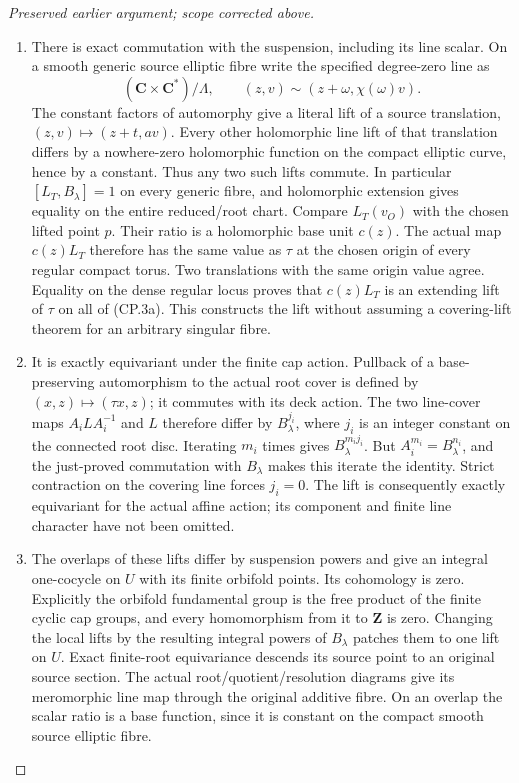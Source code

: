 \begin{proof}[Preserved earlier argument; scope corrected above]
\begin{enumerate}[label=\arabic*.]
\item There is exact commutation with the suspension, including its line
scalar. On a smooth generic source elliptic fibre write the
specified degree-zero line as
\[
 (\mathbf C\times\mathbf C^*)/\Lambda,\qquad
 (z,v)\sim(z+\omega,\chi(\omega)v).
\]
The constant factors of automorphy give a literal lift of a source
translation, \((z,v)\mapsto(z+t,av)\). Every other holomorphic
line lift of that translation differs by a nowhere-zero holomorphic
function on the compact elliptic curve, hence by a constant. Thus
any two such lifts commute. In particular \([L_T,B_\lambda]=1\)
on every generic fibre, and holomorphic extension gives equality
on the entire reduced/root chart. Compare \(L_T(v_O)\) with the
chosen lifted point \(p\). Their ratio is a holomorphic base unit
\(c(z)\). The actual map \(c(z)L_T\) therefore has the same value
as \(\tau\) at the chosen origin of every regular compact torus.
Two translations with the same origin value agree. Equality on the
dense regular locus proves that \(c(z)L_T\) is an extending lift of
\(\tau\) on all of (CP.3a). This constructs the lift without
assuming a covering-lift theorem for an arbitrary singular fibre.

\item It is exactly equivariant under the finite cap action. Pullback of
a base-preserving automorphism to the actual root cover is defined
by \((x,z)\mapsto(\tau x,z)\); it commutes with its deck action.
The two line-cover maps \(A_i L A_i^{-1}\) and \(L\) therefore
differ by \(B_\lambda^{j_i}\), where \(j_i\) is an integer constant
on the connected root disc. Iterating \(m_i\) times gives
\(B_\lambda^{m_i j_i}\). But \(A_i^{m_i}=B_\lambda^{n_i}\),
and the just-proved commutation with \(B_\lambda\) makes this
iterate the identity. Strict contraction on the covering line forces
\(j_i=0\). The lift is consequently exactly equivariant for the
actual affine action; its component and finite line character have
not been omitted.

\item The overlaps of these lifts differ by suspension powers and give
an integral one-cocycle on \(U\) with its finite orbifold points.
Its cohomology is zero. Explicitly the orbifold fundamental group
is the free product of the finite cyclic cap groups, and every
homomorphism from it to \(\mathbf Z\) is zero. Changing the local
lifts by the resulting integral powers of \(B_\lambda\) patches
them to one lift on \(U\). Exact finite-root equivariance descends
its source point to an original source section. The actual
root/quotient/resolution diagrams give its meromorphic line map
through the original additive fibre. On an overlap the scalar
ratio is a base function, since it is constant on the compact
smooth source elliptic fibre.


\end{enumerate}
\end{proof}
